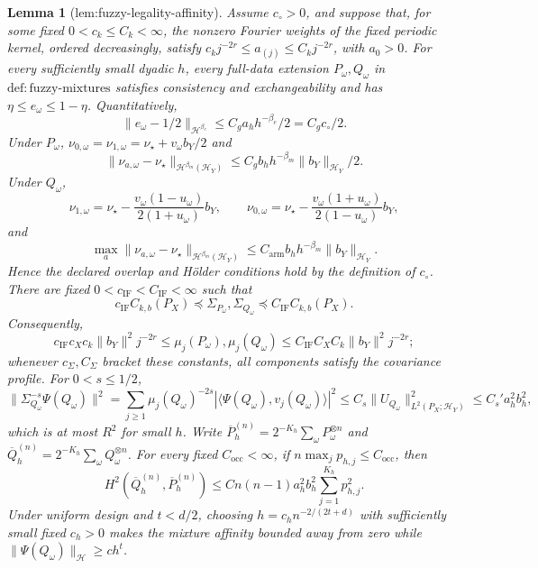 \documentclass{article}
\newtheorem{lemma}{Lemma}
\begin{document}
\begin{lemma}[lem:fuzzy-legality-affinity]\label{lem:fuzzy-legality-affinity}
Assume \(c_\circ>0\), and suppose that, for some fixed \(0<c_k\le C_k<\infty\), the nonzero Fourier weights of the fixed periodic kernel, ordered decreasingly, satisfy \(c_kj^{-2r}\le a_{(j)}\le C_kj^{-2r}\), with \(a_0>0\). For every sufficiently small dyadic \(h\), every full-data extension \(P_\omega,Q_\omega\) in \(\mathrm{def{:}fuzzy\mbox{-}mixtures}\) satisfies consistency and exchangeability and has \(\eta\le e_\omega\le1-\eta\). Quantitatively,
\[
\|e_\omega-1/2\|_{\mathcal H^{\beta_e}}\le C_ga_hh^{-\beta_e}/2=C_gc_\circ/2.
\]
Under \(P_\omega\), \(\nu_{0,\omega}=\nu_{1,\omega}=\nu_\star+v_\omega b_Y/2\) and
\[
\|\nu_{a,\omega}-\nu_\star\|_{\mathcal H^{\beta_m}(\mathcal H_Y)}
\le C_gb_hh^{-\beta_m}\|b_Y\|_{\mathcal H_Y}/2.
\]
Under \(Q_\omega\),
\[
\nu_{1,\omega}=\nu_\star-\frac{v_\omega(1-u_\omega)}{2(1+u_\omega)}b_Y,\qquad
\nu_{0,\omega}=\nu_\star-\frac{v_\omega(1+u_\omega)}{2(1-u_\omega)}b_Y,
\]
and
\[
\max_a\|\nu_{a,\omega}-\nu_\star\|_{\mathcal H^{\beta_m}(\mathcal H_Y)}
\le C_{\mathrm{arm}}b_hh^{-\beta_m}\|b_Y\|_{\mathcal H_Y}.
\]
Hence the declared overlap and Hölder conditions hold by the definition of \(c_\circ\). There are fixed \(0<c_{\mathrm{IF}}<C_{\mathrm{IF}}<\infty\) such that
\[
c_{\mathrm{IF}}C_{k,b}(P_X)\preceq\Sigma_{P_\omega},\Sigma_{Q_\omega}
\preceq C_{\mathrm{IF}}C_{k,b}(P_X).
\]
Consequently,
\[
c_{\mathrm{IF}}c_Xc_k\|b_Y\|^2j^{-2r}
\le\mu_j(P_\omega),\mu_j(Q_\omega)
\le C_{\mathrm{IF}}C_XC_k\|b_Y\|^2j^{-2r};
\]
whenever \(c_\Sigma,C_\Sigma\) bracket these constants, all components satisfy the covariance profile. For \(0<s\le1/2\),
\[
\|\Sigma_{Q_\omega}^{-s}\Psi(Q_\omega)\|^2
=\sum_{j\ge1}\mu_j(Q_\omega)^{-2s}
 |\langle\Psi(Q_\omega),v_j(Q_\omega)\rangle|^2
\le C_s\|U_{Q_\omega}\|_{L^2(P_X;\mathcal H_Y)}^2
\le C_s'a_h^2b_h^2,
\]
which is at most \(R^2\) for small \(h\). Write
\(\overline P_h^{(n)}=2^{-K_h}\sum_\omega P_\omega^{\otimes n}\) and
\(\overline Q_h^{(n)}=2^{-K_h}\sum_\omega Q_\omega^{\otimes n}\).
For every fixed \(C_{\mathrm{occ}}<\infty\), if
\(n\max_jp_{h,j}\le C_{\mathrm{occ}}\), then
\[
H^2(\overline Q_h^{(n)},\overline P_h^{(n)})
\le Cn(n-1)a_h^2b_h^2\sum_{j=1}^{K_h}p_{h,j}^2.
\]
Under uniform design and \(t<d/2\), choosing \(h=c_hn^{-2/(2t+d)}\) with sufficiently small fixed \(c_h>0\) makes the mixture affinity bounded away from zero while \(\|\Psi(Q_\omega)\|_{\mathcal H}\ge ch^t\).
\end{lemma}
\end{document}

